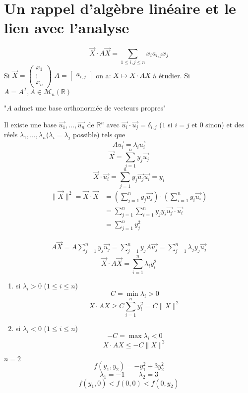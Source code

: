\documentclass[a4paper]{report}
\newcommand\R{\ensuremath{\mathbb{R}}}
\theoremstyle{definition}
\begin{document}
\section{Un rappel d'algèbre linéaire et le lien avec l'analyse}
\[
    \vec{X} \cdot A\vec{X} = \sum_{1\le i,j \le n}^{} x_ia_{i,j}x_j
\] 
Si $\vec{X} = \begin{pmatrix} x_1 \\ \vdots \\ x_n \end{pmatrix}$ $A = \begin{bmatrix} a_{i,j} \end{bmatrix}$ on a: $X \mapsto X \cdot AX$ à étudier. Si $A = A^T, A \in \mathcal{M}_n(\R)$
\begin{center}
   "$A$ admet une base orthonormée de vecteurs propres" 
\end{center}
Il existe une base $\vec{u_1}, \ldots, \vec{u_n}$ de $\R^n$ avec $\vec{u_i} \cdot \vec{u_j} = \delta_{i, j}$ ($1$ si  $i = j$ et  $0$ sinon) et des réels $\lambda_1, \ldots, \lambda_n$($\lambda_i = \lambda_j$ possible) tels que
\[
    A\vec{u_i} = \lambda_i\vec{u_i}
\] 
\[
    \vec{X} = \sum_{j=1}^{n} y_j\vec{u_j}
\] 
\[
    \vec{X} \cdot \vec{u_i} = \sum_{j=1}^{n} y_j\vec{u_j}\vec{u_i} = y_i
\] 
\begin{align*}
    \|\vec{X}\|^2 = \vec{X} \cdot \vec{X} &= \left( \sum_{j=1}^{n} y_j\vec{u_j} \right) \cdot \left( \sum_{i=1}^{n} y_i\vec{u_i} \right) \\
                                          &= \sum_{j=1}^{n} \sum_{i=1}^{n} y_jy_i\vec{u_j}\cdot \vec{u_i}\\ 
                                          &= \sum_{j=1}^{n} y_j^2
\end{align*}

\begin{align*}
    A\vec{X} = A \sum_{j=1}^{n} y_j\vec{u_j} = \sum_{j=1}^{n} y_jA\vec{u_j} = \sum_{j=1}^{n} \lambda_jy_j\vec{u_j}
\end{align*}
\[
    \vec{X} \cdot A\vec{X} = \sum_{i=1}^{n} \lambda_iy_i^2
\] 
\begin{enumerate}
    \item si $\lambda_i > 0$ ($1 \le i \le n$)
        \[
        C = \min \lambda_i > 0
        \] 
        \[
        X \cdot AX \ge C \sum_{i=1}^{n} y_i^2 = C \|X\|^2
        \] 
    \item si $\lambda_i < 0$ ($1 \le i \le n$)
        \[
        -C = \max \lambda_i < 0
        \] 
        \[
        X \cdot AX \le -C\|X\|^2
        \] 
\end{enumerate}
\begin{eg}
   $n = 2$ 
   \[
   f(y_1, y_2) = -y_1^2 + 3y_2^2
   \] 
   \[
   \lambda_1 = -1 \qquad \lambda_2 = 3
   \] 
   \[
   f(y_1, 0) < f(0, 0) < f(0, y_2)
   \] 
\end{eg}
\end{document}
